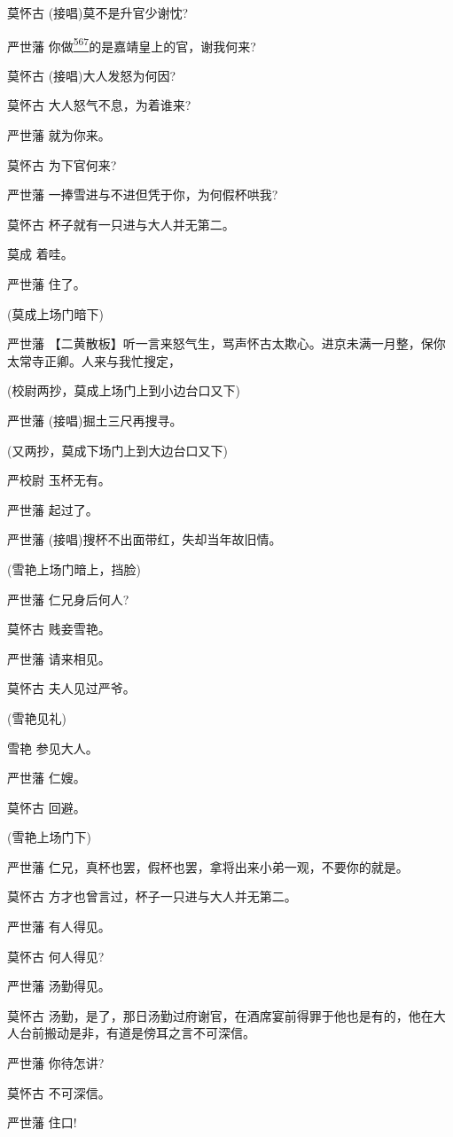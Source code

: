 莫怀古 (接唱)莫不是升官少谢忱?

严世藩
你做\protect\hyperlink{fn567}{\textsuperscript{567}}的是嘉靖皇上的官，谢我何来?

莫怀古 (接唱)大人发怒为何因?

莫怀古 大人怒气不息，为着谁来?

严世藩 就为你来。

莫怀古 为下官何来?

严世藩 一捧雪进与不进但凭于你，为何假杯哄我?

莫怀古 杯子就有一只进与大人并无第二。

莫成 着哇。

严世藩 住了。

(莫成上场门暗下)

严世藩
【二黄散板】听一言来怒气生，骂声怀古太欺心。进京未满一月整，保你太常寺正卿。人来与我忙搜定，

(校尉两抄，莫成上场门上到小边台口又下)

严世藩 (接唱)掘土三尺再搜寻。

(又两抄，莫成下场门上到大边台口又下)

严校尉 玉杯无有。

严世藩 起过了。

严世藩 (接唱)搜杯不出面带红，失却当年故旧情。

(雪艳上场门暗上，挡脸)

严世藩 仁兄身后何人?

莫怀古 贱妾雪艳。

严世藩 请来相见。

莫怀古 夫人见过严爷。

(雪艳见礼)

雪艳 参见大人。

严世藩 仁嫂。

莫怀古 回避。

(雪艳上场门下)

严世藩 仁兄，真杯也罢，假杯也罢，拿将出来小弟一观，不要你的就是。

莫怀古 方才也曾言过，杯子一只进与大人并无第二。

严世藩 有人得见。

莫怀古 何人得见?

严世藩 汤勤得见。

莫怀古
汤勤，是了，那日汤勤过府谢官，在酒席宴前得罪于他也是有的，他在大人台前搬动是非，有道是傍耳之言不可深信。

严世藩 你待怎讲?

莫怀古 不可深信。

严世藩 住口!

